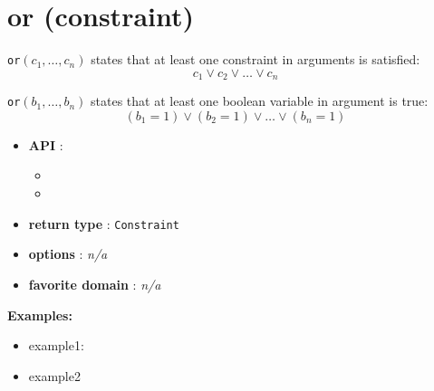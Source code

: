 \label{or}
\hypertarget{or}{}

\section{or (constraint)}\label{or:orconstraint}\hypertarget{or:orconstraint}{}
\begin{notedef}
  \texttt{or}$(c_1,\ldots,c_n)$ states that at least one constraint in arguments is satisfied:
$$ c_1 \lor c_2 \lor\ldots\lor c_n$$

  \texttt{or}$(b_1,\ldots,b_n)$ states that at least one boolean variable in argument is true:
$$ (b_1=1) \lor (b_2=1) \lor\ldots\lor (b_n=1)$$
\end{notedef}

\begin{itemize}
\item \textbf{API} : 
\begin{itemize}
\item {}
\item {}
\end{itemize}
	\item \textbf{return type} : \texttt{Constraint}
	\item \textbf{options} : \emph{n/a}
	\item \textbf{favorite domain} : \emph{n/a}
\end{itemize}

\textbf{Examples:}
\begin{itemize}
	\item example1:
\end{itemize}

\begin{itemize}
	\item example2
\end{itemize}

